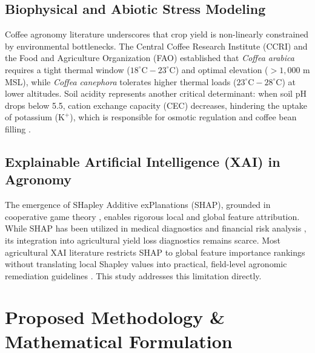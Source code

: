 \documentclass[conference]{IEEEtran}
\begin{document}
\subsection{Biophysical and Abiotic Stress Modeling}
Coffee agronomy literature underscores that crop yield is non-linearly constrained by environmental bottlenecks. The Central Coffee Research Institute (CCRI) \cite{coffeeboard2022} and the Food and Agriculture Organization (FAO) \cite{fao2018} established that \textit{Coffea arabica} requires a tight thermal window ($18^\circ\text{C} - 23^\circ\text{C}$) and optimal elevation ($>1,000\text{ m}$ MSL), while \textit{Coffea canephora} tolerates higher thermal loads ($23^\circ\text{C} - 28^\circ\text{C}$) at lower altitudes. Soil acidity represents another critical determinant: when soil pH drops below 5.5, cation exchange capacity (CEC) decreases, hindering the uptake of potassium ($\text{K}^+$), which is responsible for osmotic regulation and coffee bean filling \cite{martins2021}.

\subsection{Explainable Artificial Intelligence (XAI) in Agronomy}
The emergence of SHapley Additive exPlanations (SHAP), grounded in cooperative game theory \cite{lundberg2017}, enables rigorous local and global feature attribution. While SHAP has been utilized in medical diagnostics and financial risk analysis \cite{holzinger2022}, its integration into agricultural yield loss diagnostics remains scarce. Most agricultural XAI literature restricts SHAP to global feature importance rankings without translating local Shapley values into practical, field-level agronomic remediation guidelines \cite{lundberg2020}. This study addresses this limitation directly.

\section{Proposed Methodology \& Mathematical Formulation}
\end{document}

